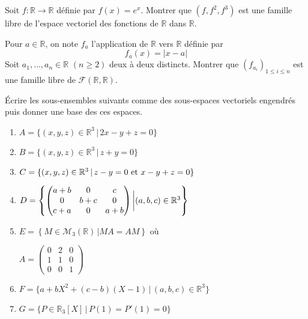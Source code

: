 \documentclass[a4paper,10pt]{report}
\begin{document}
\begin{Exa} Soit $f : \mathbb{R} \rightarrow \mathbb{R}$ définie par $f(x)=e^x$. Montrer que $(f,f^2,f^3)$ est une famille libre de l'espace vectoriel des fonctions de $\mathbb{R}$ dans $\mathbb{R}$.
\end{Exa}

\begin{Exa}[\ding{80}] Pour $a \in \mathbb{R}$, on note $f_a$ l'application de $\mathbb{R}$ vers $\mathbb{R}$ définie par 
$$f_a(x) = \vert x - a \vert$$
Soit $a_1, \ldots, a_n \in \mathbb{R}$ $(n \geq 2)$ deux à deux distincts. Montrer que $(f_{a_i})_{1 \leq i \leq n}$ est une famille libre de $\mathcal{F}(\mathbb{R}, \mathbb{R})$.
\end{Exa} 

\begin{Exa} Écrire les sous-ensembles suivants comme des sous-espaces vectoriels engendrés puis donner une base des ces espaces. 

\begin{multicols}{2}
\begin{enumerate}
\item $A=\lbrace (x,y,z) \in \mathbb{R}^3 \, \vert  \, 2x-y+z=0 \rbrace$
\item $B= \lbrace (x,y,z) \in \mathbb{R}^3 \, \vert \, z+y=0 \rbrace$
\item $C= \lbrace (x,y,z) \in \mathbb{R}^3 \, \vert \, z-y=0 \hbox{ et } x-y+z=0 \rbrace$

\item $D = \left\lbrace \begin{pmatrix}
a+b & 0 & c \\
0 & b+c & 0 \\
c+a & 0& a+b 
\end{pmatrix} \bigg{\vert} (a,b,c) \in \mathbb{R}^3 \right\rbrace$

\columnbreak
\item $E = \left\lbrace M \in \mathcal{M}_3(\mathbb{R}) \,\vert  MA=AM \right\rbrace$ où \newline \begin{center}
$A = \begin{pmatrix}
0 & 2 & 0 \\
1 & 1 & 0 \\
0 & 0 & 1 
\end{pmatrix}$
\end{center}
\item $F= \lbrace a + bX^2 + (c-b)(X-1) \, \vert \, (a,b,c) \in \mathbb{R}^3 \rbrace$
\item $G = \lbrace P \in \mathbb{R}_3[X] \, \vert \, P(1)=P'(1)=0 \rbrace$
\end{enumerate}
\end{multicols}

\vspace{0.05cm}
\end{Exa}
\end{document}
